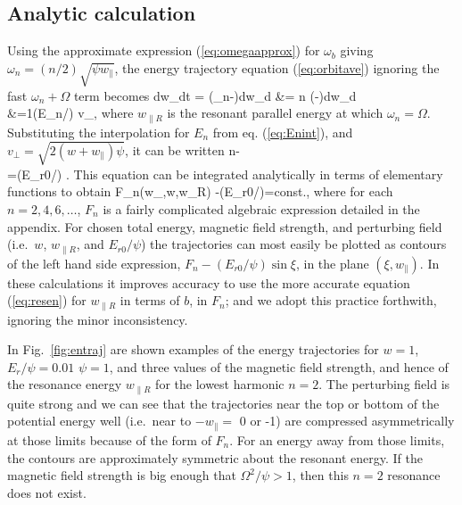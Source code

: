 \documentclass{agujournal2019}
\let\oldequation\equation
\let\oldendequation\endequation
\renewenvironment{equation}
  {\linenomathNonumbers\oldequation}
  {\oldendequation\endlinenomath}
\let\oldalign\align
\let\oldendalign\endalign
\renewenvironment{align}
  {\linenomathNonumbers\oldalign}
  {\oldendalign\endlinenomath}
\def\wp{w_\parallel}
\def\wr{w_{\parallel R}}
\begin{document}
\subsection{Analytic calculation}

Using the approximate expression (\ref{eq:omegaapprox}) for $\omega_b$
giving $\omega_n=(n/2)\sqrt{\psi \wp}$, the energy trajectory
equation (\ref{eq:orbitave}) ignoring the fast $\omega_n+\Omega$ term becomes
\begin{align}
  \label{eq:combinedtraj}
  {d\wp \over dt}
  = (\omega_n-\Omega){d\wp \over d\xi}
  &=  {n\sqrt{\psi}} (\sqrt{\wp}-\sqrt{\wr }){d\wp \over d\xi}
\nonumber\\
  &={1}(E_n/\psi) v_\perp \cos\xi,
\end{align}
where $\wr$ is the resonant parallel energy at which
$\omega_n=\Omega$. Substituting the interpolation for $E_n$ from
eq. (\ref{eq:Enint}), and $v_\perp=\sqrt{2(w+\wp)\psi}$, it can be written
\begin{align}
  \label{eq:combtraj1}
  n{\sqrt{\wp}-\sqrt{\wr }\over{} \sqrt{w+\wp}}
   \left[{n/2\over (1-\sqrt{\wp})^m} + 
     {\pi\over8}{1\over\sqrt{\wp}}\right]
   {d\wp \over d\xi}\nonumber\\
  =(E_{r0}/\psi) \cos\xi.
\end{align}
This equation can be integrated analytically in terms of elementary
functions to obtain
\begin{equation}
  \label{eq:w2solution}
  F_n(\wp,w,\wr ) -(E_{r0}/\psi)\sin\xi=const.,
\end{equation}
where for each $n=2,4,6,\dots$, $F_n$ is a fairly complicated
algebraic expression detailed in the appendix.  For chosen total
energy, magnetic field strength, and perturbing field (i.e.\ $w$,
$\wr $, and $E_{r0}/\psi$) the trajectories can most easily be plotted
as contours of the left hand side expression,
$F_n-(E_{r0}/\psi)\sin\xi$, in the plane $(\xi,\wp)$. In these
calculations it improves accuracy to use the more accurate equation
(\ref{eq:resen}) for $\wr$ in terms of $b$, in $F_n$; and we adopt
this practice forthwith, ignoring the minor inconsistency.

\label{illusfig}
In Fig.\ \ref{fig:entraj} are shown examples of the energy
trajectories for $w=1$, $E_r/\psi=0.01$ $\psi=1$, and three values of the
magnetic field strength, and hence of the resonance energy $\wr $ for
the lowest harmonic $n=2$.  
The perturbing field is quite strong and we can see
that the trajectories near the top or bottom of the potential energy
well (i.e.\ near to $-\wp =$ 0 or -1) are compressed asymmetrically at
those limits because of the form of $F_n$. For an energy away from
those limits, the contours are approximately symmetric about the
resonant energy. If the magnetic field strength is big enough that
$\Omega^2/\psi >1$, then this $n=2$ resonance does not exist.
\end{document}
